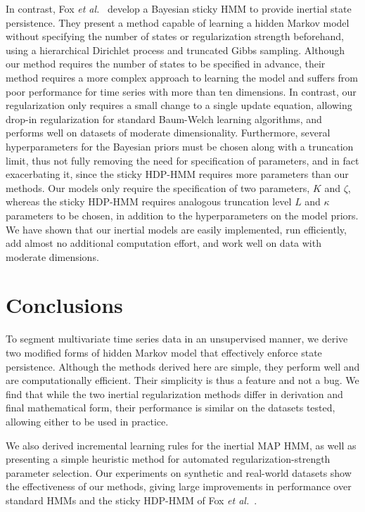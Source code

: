 \documentclass[letterpaper]{article}
\begin{document}
In contrast, Fox \emph{et al.}\ \cite{fox2011sticky} develop a Bayesian sticky
HMM to provide inertial state persistence. They present a method capable of
learning a hidden Markov model without specifying the number of states or
regularization strength beforehand, using a hierarchical Dirichlet process and
truncated Gibbs sampling. Although our method requires the number of states to
be specified in advance, their method requires a more complex approach to
learning the model and suffers from poor performance for time series with more
than ten dimensions. In contrast, our regularization only requires a small
change to a single update equation, allowing drop-in regularization for standard
Baum-Welch learning algorithms, and performs well on datasets of moderate
dimensionality. Furthermore, several hyperparameters for the Bayesian priors
must be chosen along with a truncation limit, thus not fully removing the need
for specification of parameters, and in fact exacerbating it, since the sticky
HDP-HMM requires more parameters than our methods. Our models
only require the specification of two parameters, $K$ and $\zeta$, whereas the
sticky HDP-HMM requires analogous truncation level $L$ and $\kappa$ parameters
to be chosen, in addition to the hyperparameters on the model priors. We have
shown that our inertial models are easily implemented, run efficiently, add
almost no additional computation effort, and work well on data with moderate
dimensions.

\section{Conclusions}

To segment multivariate time series data in an unsupervised manner, we derive two modified forms of hidden Markov model that effectively enforce state persistence. Although the methods derived here are simple, they perform well and are computationally efficient. Their simplicity is thus a feature and not a bug. We find that while the two inertial regularization methods differ in derivation and final mathematical form, their performance is similar on the datasets tested, allowing either to be used in practice. 

We also derived incremental learning rules for the inertial MAP HMM, as well as presenting a simple heuristic method for automated regularization-strength parameter selection. Our experiments on synthetic and real-world datasets show the effectiveness of our methods, giving large improvements in performance over standard HMMs and the sticky HDP-HMM of Fox \emph{et al.}~\cite{fox2011sticky}.
\end{document}
